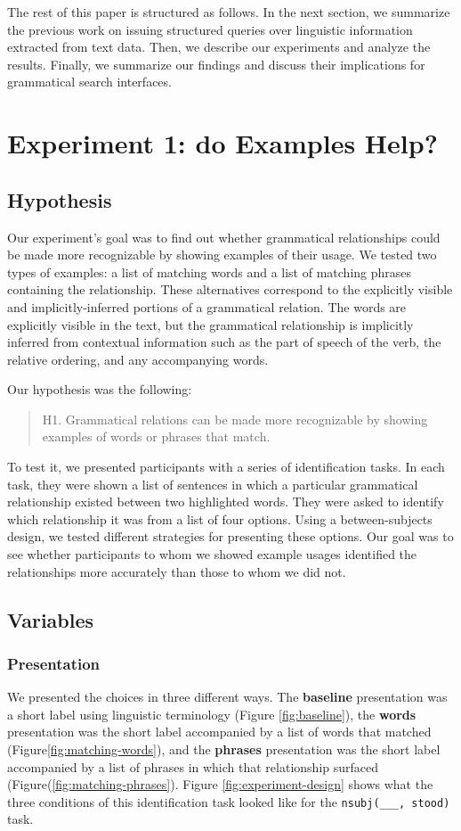 \documentclass{sigchi}
\newcommand{\strong}[1] {\textbf{#1}}
\newcommand{\code}[1] {\texttt{#1}}
\begin{document}
The rest of this paper is structured as follows. In the next section, we summarize the previous work on issuing structured queries over linguistic information extracted from text data. Then, we  describe our experiments and analyze the results. Finally, we summarize our findings and discuss their implications for grammatical search interfaces.

\section{Experiment 1: do Examples Help?}

\subsection{Hypothesis}
Our experiment's goal was to find out whether grammatical relationships could be made more recognizable by showing examples of their usage. We tested two types of examples: a list of matching words and a list of matching phrases containing the relationship. These alternatives correspond to the explicitly visible and implicitly-inferred portions of a grammatical relation. The words are explicitly visible in the text, but the grammatical relationship is implicitly inferred from contextual information such as the part of speech of the verb, the relative ordering, and any accompanying words.

Our hypothesis was the following:
\begin{quote}
	H1. Grammatical relations can be made more recognizable by showing examples of words or phrases that match.
\end{quote}


To test it, we presented participants with a series of identification tasks. In each task, they were shown a list of sentences in which a particular grammatical relationship existed between two highlighted words. They were asked to identify which relationship it was from a list of four options.  Using a between-subjects design, we tested different strategies for presenting these options. Our goal was to see whether participants to whom we showed example usages identified the relationships more accurately than those to whom we did not.

\subsection{Variables}

\subsubsection{Presentation}
We presented the choices in three different ways. The \strong{baseline} presentation was a short label using linguistic terminology (Figure \ref{fig:baseline}), the \strong{words} presentation was the short label accompanied by a list of words that matched (Figure\ref{fig:matching-words}), and the \strong{phrases} presentation was the short label accompanied by a list of phrases in which that relationship surfaced (Figure(\ref{fig:matching-phrases}).  Figure \ref{fig:experiment-design} shows what the three conditions of this identification task looked like for the \code{nsubj(\_\_\_, stood)} task.
\end{document}
